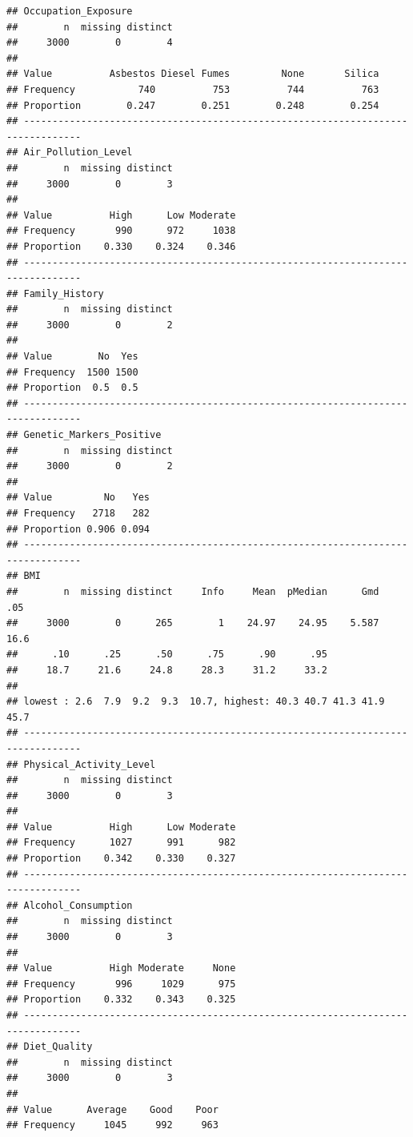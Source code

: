 \documentclass[
]{article}
\begin{document}
\begin{verbatim}
## Occupation_Exposure 
##        n  missing distinct 
##     3000        0        4 
##                                                               
## Value          Asbestos Diesel Fumes         None       Silica
## Frequency           740          753          744          763
## Proportion        0.247        0.251        0.248        0.254
## --------------------------------------------------------------------------------
## Air_Pollution_Level 
##        n  missing distinct 
##     3000        0        3 
##                                      
## Value          High      Low Moderate
## Frequency       990      972     1038
## Proportion    0.330    0.324    0.346
## --------------------------------------------------------------------------------
## Family_History 
##        n  missing distinct 
##     3000        0        2 
##                     
## Value        No  Yes
## Frequency  1500 1500
## Proportion  0.5  0.5
## --------------------------------------------------------------------------------
## Genetic_Markers_Positive 
##        n  missing distinct 
##     3000        0        2 
##                       
## Value         No   Yes
## Frequency   2718   282
## Proportion 0.906 0.094
## --------------------------------------------------------------------------------
## BMI 
##        n  missing distinct     Info     Mean  pMedian      Gmd      .05 
##     3000        0      265        1    24.97    24.95    5.587     16.6 
##      .10      .25      .50      .75      .90      .95 
##     18.7     21.6     24.8     28.3     31.2     33.2 
## 
## lowest : 2.6  7.9  9.2  9.3  10.7, highest: 40.3 40.7 41.3 41.9 45.7
## --------------------------------------------------------------------------------
## Physical_Activity_Level 
##        n  missing distinct 
##     3000        0        3 
##                                      
## Value          High      Low Moderate
## Frequency      1027      991      982
## Proportion    0.342    0.330    0.327
## --------------------------------------------------------------------------------
## Alcohol_Consumption 
##        n  missing distinct 
##     3000        0        3 
##                                      
## Value          High Moderate     None
## Frequency       996     1029      975
## Proportion    0.332    0.343    0.325
## --------------------------------------------------------------------------------
## Diet_Quality 
##        n  missing distinct 
##     3000        0        3 
##                                   
## Value      Average    Good    Poor
## Frequency     1045     992     963

\end{verbatim}
\end{document}
